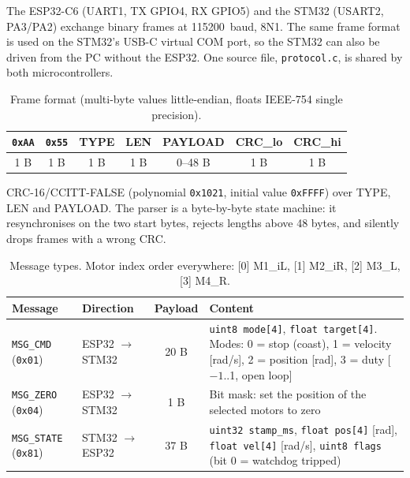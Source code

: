 \documentclass[12pt,a4paper]{article}
\begin{document}
The ESP32-C6 (UART1, TX GPIO4, RX GPIO5) and the STM32 (USART2, PA3/PA2) exchange binary
frames at \SI{115200}{baud}, 8N1. The same frame format is used on the STM32's USB-C virtual
COM port, so the STM32 can also be driven from the PC without the ESP32. One source file,
\texttt{protocol.c}, is shared by both microcontrollers.

\begin{table}[H]
\centering
\caption{Frame format (multi-byte values little-endian, floats IEEE-754 single precision).}
\label{pr3:tab:frame}
\small
\begin{tabular}{ccccccc}
\toprule
\texttt{0xAA} & \texttt{0x55} & TYPE & LEN & PAYLOAD & CRC\_lo & CRC\_hi \\
\midrule
1 B & 1 B & 1 B & 1 B & 0--48 B & 1 B & 1 B \\
\bottomrule
\end{tabular}

\vspace{2mm}
\parbox{0.92\linewidth}{\footnotesize CRC-16/CCITT-FALSE (polynomial \texttt{0x1021}, initial value
\texttt{0xFFFF}) over TYPE, LEN and PAYLOAD. The parser is a byte-by-byte state machine: it
resynchronises on the two start bytes, rejects lengths above 48 bytes, and silently drops
frames with a wrong CRC.}
\end{table}

\begin{table}[H]
\centering
\caption{Message types. Motor index order everywhere: [0] M1\_iL, [1] M2\_iR, [2] M3\_L, [3] M4\_R.}
\label{pr3:tab:msgs}
\small
\begin{tabularx}{\linewidth}{l l c >{\raggedright\arraybackslash}X}
\toprule
Message & Direction & Payload & Content \\
\midrule
\texttt{MSG\_CMD} (\texttt{0x01})   & ESP32 $\rightarrow$ STM32 & 20 B & \texttt{uint8 mode[4]}, \texttt{float target[4]}. Modes: 0 = stop (coast), 1 = velocity [rad/s], 2 = position [rad], 3 = duty [$-1$..1, open loop] \\
\texttt{MSG\_ZERO} (\texttt{0x04})  & ESP32 $\rightarrow$ STM32 & 1 B  & Bit mask: set the position of the selected motors to zero \\
\texttt{MSG\_STATE} (\texttt{0x81}) & STM32 $\rightarrow$ ESP32 & 37 B & \texttt{uint32 stamp\_ms}, \texttt{float pos[4]} [rad], \texttt{float vel[4]} [rad/s], \texttt{uint8 flags} (bit 0 = watchdog tripped) \\
\bottomrule
\end{tabularx}
\end{table}
\end{document}
